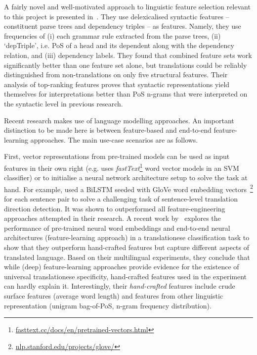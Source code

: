A fairly novel and well-motivated approach to linguistic feature selection relevant to this project is presented in~\citet{Hu2018}. They use delexicalised syntactic features -- constituent parse trees and dependency triples -- as features. Namely, they use frequencies of (i) each grammar rule extracted from the parse trees, (ii) `depTriple', i.e. PoS of a head and its dependent along with the dependency relation, and (iii) dependency labels. They found that combined feature sets work significantly better than one feature set alone, but translations could be reliably distinguished from non-translations on only five structural features. Their analysis of top-ranking features proves that syntactic representations yield themselves for interpretations better than PoS n-grams that were interpreted on the syntactic level in previous research.  

Recent research makes use of language modelling approaches. An important distinction to be made here is between feature-based and end-to-end feature-learning approaches. The main use-case scenarios are as follows. 

First, vector representations from pre-trained models can be used as input features in their own right (e.g. \citet{Pylypenko2021} uses \textit{fastText}\footnote{\url{fasttext.cc/docs/en/pretrained-vectors.html}} word vector models in an SVM classifier) or to initialise a neural network architecture setup to solve the task at hand. For example, \citet{Sominsky2019} used a \gls{BiLSTM} seeded with GloVe word embedding vectors~\footnote{\url{nlp.stanford.edu/projects/glove/}} for each sentence pair to solve a challenging task of sentence-level translation direction detection. It was shown to outperformed all feature-engineering approaches attempted in their research. 
A recent work by~\citet{Pylypenko2021} explores the performance of pre-trained neural word embeddings and end-to-end neural architectures (feature-learning approach) in a translationese classification task to show that they outperform hand-crafted features but capture different aspects of translated language. Based on their multilingual experiments, they conclude that while (deep) feature-learning approaches provide evidence for the existence of universal translationese specificity, hand-crafted features used in the experiment can hardly explain it. Interestingly, their \textit{hand-crafted} features include crude surface features (average word length) and features from other linguistic representation (unigram bag-of-PoS, n-gram frequency distribution). %

